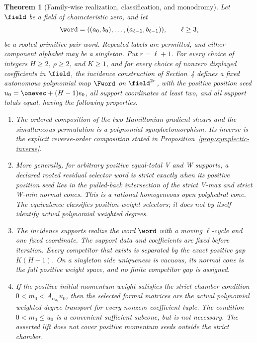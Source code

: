 \documentclass[11pt,letterpaper]{article}
\newtheorem{theoremA}{Theorem}
\theoremstyle{definition}
\theoremstyle{remark}
\numberwithin{equation}{section}
\begin{document}
\begin{theoremA}[Family-wise realization, classification, and monodromy]
\label{thm:main}
Let \(\field\) be a field of characteristic zero, and let
\begin{equation}
 \word=((a_0,b_0),\ldots,(a_{\ell-1},b_{\ell-1})),
 \qquad \ell\geq3,
 \label{eq:word}
\end{equation}
be a rooted primitive pair word.  Repeated labels are permitted, and either
component alphabet may be a singleton.  Put \(r=\ell+1\).  For every
choice of integers \(H\geq2\), \(\rho\geq2\), and \(K\geq1\), and for
every choice of nonzero displayed coefficients in \(\field\), the incidence
construction of Section~4 defines a fixed autonomous polynomial map
\(\Fword\) on \(\field^{2r}\), with the positive position seed
\(u_0=\onevec+(H-1)e_0\), all support coordinates at least two, and all
support totals equal, having the following properties.

\begin{enumerate}[label=\textup{(\arabic*)},leftmargin=2.8em]
\item The ordered composition of the two Hamiltonian gradient shears and the
simultaneous permutation is a polynomial symplectomorphism.  Its inverse is
the explicit reverse-order composition stated in
Proposition~\ref{prop:symplectic-inverse}.

\item More generally, for arbitrary positive equal-total V and W supports,
a declared rooted residual selector word is strict exactly when its positive
position seed lies in the pulled-back intersection of the strict V-max and
strict W-min normal cones.  This is a rational homogeneous open polyhedral
cone.  The equivalence classifies position-weight selectors; it does not by
itself identify actual polynomial weighted degrees.

\item The incidence supports realize the word \(\word\) with a moving
\(\ell\)-cycle and one fixed coordinate.  The support data and coefficients
are fixed before iteration.  Every competitor that exists is separated by
the exact positive gap \(K(H-1)\).  On a singleton side uniqueness is
vacuous, its normal cone is the full positive weight space, and no finite
competitor gap is assigned.

\item If the positive initial momentum weight satisfies the strict chamber
condition \(0<m_0<A_{\alpha_{a_0}}u_0\), then the selected formal matrices
are the actual polynomial weighted-degree transport for every nonzero
coefficient tuple.  The condition \(0<m_0\leq u_0\) is a convenient
sufficient subcone, but is not necessary.  The asserted lift does not cover
positive momentum seeds outside the strict chamber.


\end{enumerate}
\end{theoremA}
\end{document}
